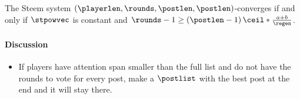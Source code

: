 \begin{theorem}
  The Steem system $\left(\playerlen, \rounds, \postlen,
  \postlen\right)$-converges if and only if $\stpowvec$ is constant and $\rounds
  - 1 \geq \left(\postlen - 1\right) \ceil*{\frac{a + b}{\regen}}$.
\end{theorem}

  \paragraph{Discussion}
    \begin{itemize}
      \item If players have attention span smaller than the full list and do not
      have the rounds to vote for every post, make a $\postlist$ with the best
      post at the end and it will stay there.
    \end{itemize}
